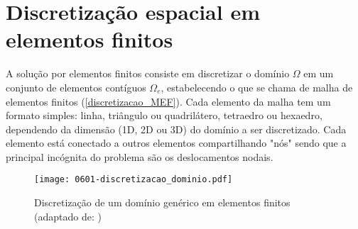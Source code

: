\section{Discretização espacial em elementos finitos}
A solução por elementos finitos consiste em discretizar o domínio $\Omega$ em um conjunto de elementos contíguos $\Omega_e$, estabelecendo o que se chama de malha de elementos finitos (\autoref{discretizacao_MEF}). Cada elemento da malha tem um formato simples: linha, triângulo ou quadrilátero, tetraedro ou hexaedro, dependendo da dimensão (1D, 2D ou 3D) do domínio a ser discretizado. Cada elemento está conectado a outros elementos compartilhando "nós" sendo que a principal incógnita do problema são os deslocamentos nodais.
\begin{figure}[H]
	\begin{center}
		\texttt{[image: 0601-discretizacao\_dominio.pdf]}
	\end{center}
	\caption{\label{discretizacao_MEF}Discretização de um domínio genérico em elementos finitos (adaptado de: )}
\end{figure}

